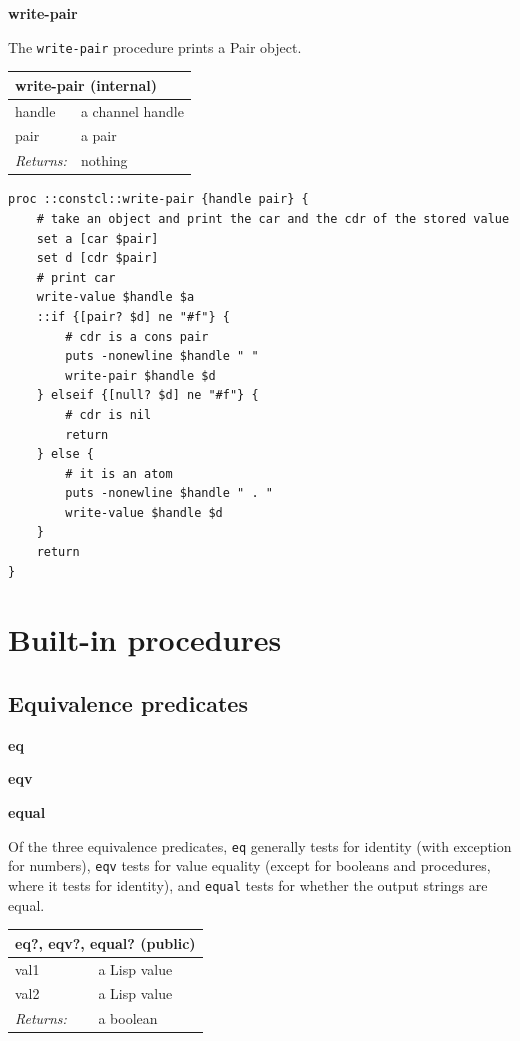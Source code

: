 \documentclass[twoside,9pt]{report}
\begin{document}
\textbf{write-pair}


The \texttt{write-pair} procedure prints a Pair object.

\begin{tabular}{ |l l| }
\hline
\multicolumn{2}{|l|}{write-pair (internal)} \\
\hline
handle & a channel handle \\
pair & a pair \\
\textit{Returns:} & nothing \\
\hline
\end{tabular}

\noindent\makebox[\linewidth]{\rule{\linewidth}{0.4pt}}
\begin{lstlisting}
proc ::constcl::write-pair {handle pair} {
    # take an object and print the car and the cdr of the stored value
    set a [car $pair]
    set d [cdr $pair]
    # print car
    write-value $handle $a
    ::if {[pair? $d] ne "#f"} {
        # cdr is a cons pair
        puts -nonewline $handle " "
        write-pair $handle $d
    } elseif {[null? $d] ne "#f"} {
        # cdr is nil
        return
    } else {
        # it is an atom
        puts -nonewline $handle " . "
        write-value $handle $d
    }
    return
}
\end{lstlisting}
\noindent\makebox[\linewidth]{\rule{\linewidth}{0.4pt}}
\section{Built-in procedures}
\label{built-in-procedures}
\subsection{Equivalence predicates}
\label{equivalence-predicates}

\textbf{eq}


\textbf{eqv}


\textbf{equal}


Of the three equivalence predicates, \texttt{eq} generally tests for identity (with exception for numbers), \texttt{eqv} tests for value equality (except for booleans and procedures, where it tests for identity), and \texttt{equal} tests for whether the output strings are equal.

\begin{tabular}{ |l l| }
\hline
\multicolumn{2}{|l|}{eq?, eqv?, equal? (public)} \\
\hline
val1 & a Lisp value \\
val2 & a Lisp value \\
\textit{Returns:} & a boolean \\
\hline
\end{tabular}
\end{document}
